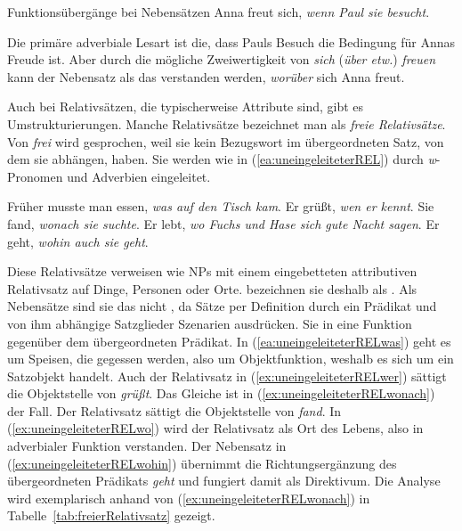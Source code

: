\begin{Exkurs}{Funktionsübergänge bei Nebensätzen}
\ea \label{ea:sich_freuen_wenn} Anna freut sich, \textit{wenn Paul sie besucht}.
\z 

Die primäre adverbiale Lesart ist die, dass Pauls Besuch die Bedingung für Annas Freude ist. Aber durch die mögliche Zweiwertigkeit von \textit{sich} (\textit{über etw.}) \textit{freuen} kann der Nebensatz als das verstanden werden, \textit{worüber} sich Anna freut.

Auch bei Relativsätzen, die typischerweise Attribute sind, gibt es Umstrukturierungen. Manche Relativsätze bezeichnet man als \textit{freie Relativsätze}. Von \textit{frei} wird gesprochen, weil sie kein Bezugswort im übergeordneten Satz, von dem sie abhängen, haben. Sie werden wie in (\ref{ea:uneingeleiteterREL}) durch \textit{w}-Pronomen und Adverbien eingeleitet.

\ea \label{ea:uneingeleiteterREL}
\ea \label{ea:uneingeleiteterRELwas} Früher musste man essen, \textit{was auf den Tisch kam}.
\ex \label{ex:uneingeleiteterRELwer} Er grüßt, \textit{wen er kennt}.
\ex \label{ex:uneingeleiteterRELwonach} Sie fand, \textit{wonach sie suchte}.
\ex \label{ex:uneingeleiteterRELwo} Er lebt, \textit{wo Fuchs und Hase sich gute Nacht sagen}.
\ex \label{ex:uneingeleiteterRELwohin} Er geht, \textit{wohin auch sie geht}.
\z 
\z 

Diese Relativsätze verweisen wie NPs mit einem eingebetteten attributiven Relativsatz auf Dinge, Personen oder Orte. \citet[2270--2271]{ZifHoffStr1997} bezeichnen sie deshalb als . Als Nebensätze sind sie das nicht , da Sätze per Definition durch ein Prädikat und von ihm abhängige Satzglieder Szenarien ausdrücken. Sie  in eine Funktion gegenüber dem übergeordneten Prädikat. In (\ref{ea:uneingeleiteterRELwas}) geht es um Speisen, die gegessen werden, also um Objektfunktion, weshalb es sich um ein Satzobjekt handelt. Auch der Relativsatz in (\ref{ex:uneingeleiteterRELwer}) sättigt die Objektstelle von \textit{grüßt}. Das Gleiche ist in (\ref{ex:uneingeleiteterRELwonach}) der Fall. Der Relativsatz sättigt die Objektstelle von \textit{fand}. In (\ref{ex:uneingeleiteterRELwo}) wird der Relativsatz als Ort des Lebens, also in adverbialer Funktion verstanden. Der Nebensatz in (\ref{ex:uneingeleiteterRELwohin}) übernimmt die Richtungsergänzung des übergeordneten Prädikats \textit{geht} und fungiert damit als Direktivum. Die Analyse wird exemplarisch anhand von (\ref{ex:uneingeleiteterRELwonach}) in Tabelle~\ref{tab:freierRelativsatz} gezeigt.


\end{Exkurs}

